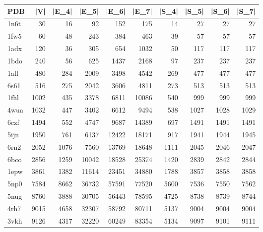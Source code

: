 \begin{tabular}{lrrrrrrrrr}
\toprule
PDB & |V| & |E_4| & |E_5| & |E_6| & |E_7| & |S_4| & |S_5| & |S_6| & |S_7| \\
\midrule
1n6t & 30 & 16 & 92 & 152 & 175 & 14 & 27 & 27 & 27 \\
1fw5 & 60 & 48 & 243 & 384 & 463 & 39 & 57 & 57 & 57 \\
1adx & 120 & 36 & 305 & 654 & 1032 & 50 & 117 & 117 & 117 \\
1bdo & 240 & 56 & 625 & 1437 & 2168 & 97 & 237 & 237 & 237 \\
1all & 480 & 284 & 2009 & 3498 & 4542 & 269 & 477 & 477 & 477 \\
6s61 & 516 & 275 & 2042 & 3606 & 4811 & 273 & 513 & 513 & 513 \\
1fhl & 1002 & 435 & 3378 & 6811 & 10086 & 540 & 999 & 999 & 999 \\
4wua & 1032 & 447 & 3402 & 6612 & 9494 & 538 & 1027 & 1028 & 1029 \\
6czf & 1494 & 552 & 4747 & 9687 & 14389 & 697 & 1491 & 1491 & 1491 \\
5ijn & 1950 & 761 & 6137 & 12422 & 18171 & 917 & 1941 & 1944 & 1945 \\
6rn2 & 2052 & 1076 & 7560 & 13769 & 18648 & 1111 & 2045 & 2046 & 2047 \\
6bco & 2856 & 1259 & 10042 & 18528 & 25374 & 1420 & 2839 & 2842 & 2844 \\
1epw & 3861 & 1382 & 11614 & 23451 & 34880 & 1788 & 3857 & 3858 & 3858 \\
5np0 & 7584 & 8662 & 36732 & 57591 & 77520 & 5600 & 7536 & 7550 & 7562 \\
5nug & 8760 & 3888 & 30705 & 56443 & 78595 & 4725 & 8738 & 8739 & 8744 \\
4rh7 & 9015 & 4658 & 32307 & 58792 & 80711 & 5137 & 9004 & 9004 & 9004 \\
3vkh & 9126 & 4317 & 32220 & 60249 & 83354 & 5134 & 9097 & 9101 & 9111 \\
\bottomrule
\end{tabular}
